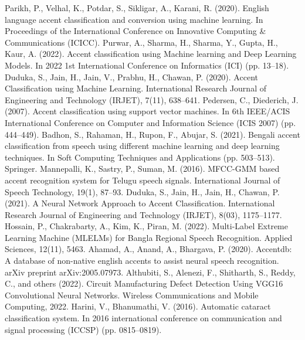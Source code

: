 \documentclass[pdflatex]{sn-jnl}%
\theoremstyle{thmstyleone}%
\theoremstyle{thmstyletwo}%
\theoremstyle{thmstylethree}%
\begin{document}
\begin{thebibliography}{9}
 Parikh, P., Velhal, K., Potdar, S., Sikligar, A., Karani, R. (2020). English language accent classification and conversion using machine learning. In Proceedings of the International Conference on Innovative Computing \& Communications (ICICC).
 Purwar, A., Sharma, H., Sharma, Y., Gupta, H., Kaur, A. (2022). Accent classification using Machine learning and Deep Learning Models. In 2022 1st International Conference on Informatics (ICI) (pp. 13–18).
 Duduka, S., Jain, H., Jain, V., Prabhu, H., Chawan, P. (2020). Accent Classification using Machine Learning. International Research Journal of Engineering and Technology (IRJET), 7(11), 638–641.
 Pedersen, C., Diederich, J. (2007). Accent classification using support vector machines. In 6th IEEE/ACIS International Conference on Computer and Information Science (ICIS 2007) (pp. 444–449).
 Badhon, S., Rahaman, H., Rupon, F., Abujar, S. (2021). Bengali accent classification from speech using different machine learning and deep learning techniques. In Soft Computing Techniques and Applications (pp. 503–513). Springer.
 Mannepalli, K., Sastry, P., Suman, M. (2016). MFCC-GMM based accent recognition system for Telugu speech signals. International Journal of Speech Technology, 19(1), 87–93.
 Duduka, S., Jain, H., Jain, H., Chawan, P. (2021). A Neural Network Approach to Accent Classification. International Research Journal of Engineering and Technology (IRJET), 8(03), 1175–1177.
 Hossain, P., Chakrabarty, A., Kim, K., Piran, M. (2022). Multi-Label Extreme Learning Machine (MLELMs) for Bangla Regional Speech Recognition. Applied Sciences, 12(11), 5463.
 Ahamad, A., Anand, A., Bhargava, P. (2020). Accentdb: A database of non-native english accents to assist neural speech recognition. arXiv preprint arXiv:2005.07973.
 Althubiti, S., Alenezi, F., Shitharth, S., Reddy, C., and others (2022). Circuit Manufacturing Defect Detection Using VGG16 Convolutional Neural Networks. Wireless Communications and Mobile Computing, 2022.
 Harini, V., Bhanumathi, V. (2016). Automatic cataract classification system. In 2016 international conference on communication and signal processing (ICCSP) (pp. 0815–0819).
\end{thebibliography}

\end{document}
